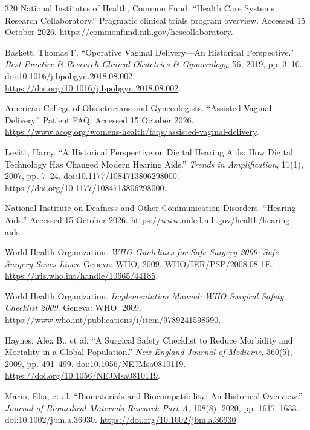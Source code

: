 \documentclass[12pt,oneside]{book}
\begin{document}
\begin{thebibliography}{320}
National Institutes of Health, Common Fund. ``Health Care Systems Research
Collaboratory.'' Pragmatic clinical trials program overview. Accessed 15 October
2026.
\url{https://commonfund.nih.gov/hcscollaboratory}.

Baskett, Thomas F. ``Operative Vaginal Delivery---An Historical Perspective.''
\emph{Best Practice \& Research Clinical Obstetrics \& Gynaecology}, 56, 2019,
pp. 3--10. doi:10.1016/j.bpobgyn.2018.08.002.
\url{https://doi.org/10.1016/j.bpobgyn.2018.08.002}.

American College of Obstetricians and Gynecologists. ``Assisted Vaginal
Delivery.'' Patient FAQ. Accessed 15 October 2026.
\url{https://www.acog.org/womens-health/faqs/assisted-vaginal-delivery}.

Levitt, Harry. ``A Historical Perspective on Digital Hearing Aids: How Digital
Technology Has Changed Modern Hearing Aids.'' \emph{Trends in Amplification},
11(1), 2007, pp. 7--24. doi:10.1177/1084713806298000.
\url{https://doi.org/10.1177/1084713806298000}.

National Institute on Deafness and Other Communication Disorders. ``Hearing
Aids.'' Accessed 15 October 2026.
\url{https://www.nidcd.nih.gov/health/hearing-aids}.

World Health Organization. \emph{WHO Guidelines for Safe Surgery 2009: Safe
Surgery Saves Lives}. Geneva: WHO, 2009. WHO/IER/PSP/2008.08-1E.
\url{https://iris.who.int/handle/10665/44185}.

World Health Organization. \emph{Implementation Manual: WHO Surgical Safety
Checklist 2009}. Geneva: WHO, 2009.
\url{https://www.who.int/publications/i/item/9789241598590}.

Haynes, Alex B., et al. ``A Surgical Safety Checklist to Reduce Morbidity and
Mortality in a Global Population.'' \emph{New England Journal of Medicine},
360(5), 2009, pp. 491--499. doi:10.1056/NEJMsa0810119.
\url{https://doi.org/10.1056/NEJMsa0810119}.

Marin, Elia, et al. ``Biomaterials and Biocompatibility: An Historical
Overview.'' \emph{Journal of Biomedical Materials Research Part A}, 108(8),
2020, pp. 1617--1633. doi:10.1002/jbm.a.36930.
\url{https://doi.org/10.1002/jbm.a.36930}.


\end{thebibliography}
\end{document}
